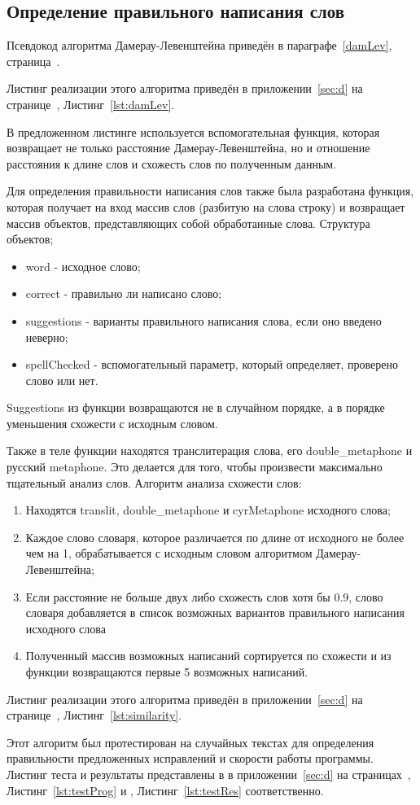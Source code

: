 \subsection{Определение правильного написания слов}

Псевдокод алгоритма Дамерау-Левенштейна приведён в параграфе~\ref{damLev}, страница~\pageref{damLev}.

Листинг реализации этого алгоритма приведён в приложении~\ref{sec:d} на странице~\pageref{lst:damLev}, Листинг~\ref{lst:damLev}.

В предложенном листинге используется вспомогательная функция, которая возвращает не только расстояние Дамерау-Левенштейна, но и отношение расстояния к длине слов и схожесть слов по полученным данным.

Для определения правильности написания слов также была разработана функция, которая получает на вход массив слов (разбитую на слова строку) и возвращает массив объектов, представляющих собой обработанные слова. Структура объектов;

\begin{itemize}
  \item word - исходное слово;
  \item correct - правильно ли написано слово;
  \item suggestions - варианты правильного написания слова, если оно введено неверно;
  \item spellChecked - вспомогательный параметр, который определяет, проверено слово или нет.
\end{itemize}

Suggestions из функции возвращаются не в случайном порядке, а в порядке уменьшения схожести с исходным словом.

Также в теле функции находятся транслитерация слова, его double\_metaphone и русский metaphone. Это делается для того, чтобы произвести максимально тщательный анализ слов. Алгоритм анализа схожести слов:

\begin{enumerate}
  \item Находятся translit, double\_metaphone и cyrMetaphone исходного слова;
  \item Каждое слово словаря, которое различается по длине от исходного не более чем на 1, обрабатывается с исходным словом алгоритмом Дамерау-Левенштейна;
  \item Если расстояние не больше двух либо схожесть слов хотя бы 0.9, слово словаря добавляется в список возможных вариантов правильного написания исходного слова
  \item Полученный массив возможных написаний сортируется по схожести и из функции возвращаются первые 5 возможных написаний.
\end{enumerate}

Листинг реализации этого алгоритма приведён в приложении~\ref{sec:d} на странице~\pageref{lst:similarity}, Листинг~\ref{lst:similarity}.

Этот алгоритм был протестирован на случайных текстах для определения правильности предложенных исправлений и скорости работы программы. Листинг теста и результаты представлены в в приложении~\ref{sec:d} на страницах~\pageref{lst:testProg}, Листинг~\ref{lst:testProg} и \pageref{lst:testRes}, Листинг~\ref{lst:testRes} соответственно.